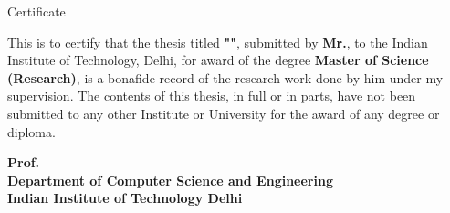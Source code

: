 \begin{center}
\LARGE{ Certificate} 
\end{center}

\vspace{0.5in}

\hspace*{1.0em} This is to certify that the thesis titled {\bf "\ThesisTitle"},
submitted by {\bf Mr.\Auth}, to the Indian Institute of Technology, Delhi,
for award of the degree {\bf Master of Science (Research)},
is a bonafide record of the research work done by him under my supervision.
The contents of this thesis, in full or in parts, have not been submitted to any
other Institute or University for the award of any degree or diploma.

\vspace{1.5in}


{\bfseries Prof. \Guide{}} \\
{\bfseries Department of Computer Science and Engineering} \\
{\bfseries Indian Institute of Technology Delhi}\\ 
